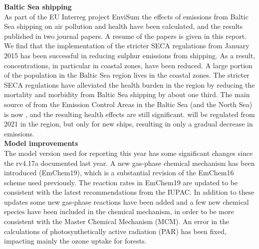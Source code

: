\noindent
\textbf{Baltic Sea shipping}\\ %
As part of the EU Interreg project EnviSum the effects of emissions from
Baltic Sea shipping on air pollution and health have been calculated, and
the results published in two journal papers. A resume of the
papers is given in this report. We find that the implementation of the
stricter SECA regulations from January 2015 has been successful in
reducing sulphur emissions from shipping.
As a result,  concentrations, in particular in coastal zones,
have been reduced. A large portion of the population in the Baltic Sea
region lives in the coastal zones. The stricter SECA regulations have 
alleviated the health burden in the region by reducing the mortality and
morbidity from Baltic Sea shipping by about one third. The main source of
 from the Emission Control Areas in the Baltic Sea (and the
North Sea) is now , and the resulting health effects are still
significant.   will be regulated from 2021 in the region, but
only for new ships, resulting in only a gradual decrease in emissions.
\\





\noindent
\textbf{Model improvements}\\ %
The model version used for reporting this year has some
significant changes since the rv4.17a documented last year. A new gas-phase chemical mechanism has been introduced (EmChem19), which is a
substantial revision of the EmChem16 scheme used previously. The reaction rates in EmChem19 are updated to be
consistent with the latest recommendations from the IUPAC. In addition to these updates some new gas-phase reactions have
been added and a few new chemical species have been included in the chemical mechanism,
in order to be more consistent with the
Master Chemical Mechanism (MCM). An error in the calculations of photosynthetically active
radiation (PAR) has been fixed, impacting mainly the ozone uptake for forests.


